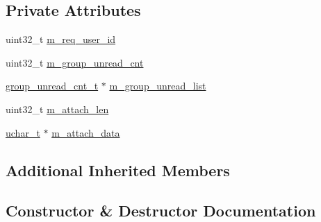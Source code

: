 \subsection*{Private Attributes}
\begin{DoxyCompactItemize}
\item 
uint32\+\_\+t \hyperlink{class_c_im_pdu_group_unread_msg_cnt_response_a74c537bd846dff72d98b2b203fbd61f1}{m\+\_\+req\+\_\+user\+\_\+id}
\item 
uint32\+\_\+t \hyperlink{class_c_im_pdu_group_unread_msg_cnt_response_ae9cb38499368408e6e37dc41002c6a03}{m\+\_\+group\+\_\+unread\+\_\+cnt}
\item 
\hyperlink{structgroup__unread__cnt__t}{group\+\_\+unread\+\_\+cnt\+\_\+t} $\ast$ \hyperlink{class_c_im_pdu_group_unread_msg_cnt_response_a0c39ff6c93b9f0c7a5ced375a6bfcd76}{m\+\_\+group\+\_\+unread\+\_\+list}
\item 
uint32\+\_\+t \hyperlink{class_c_im_pdu_group_unread_msg_cnt_response_a9a0778f7cf51c571f243a29c5b63215a}{m\+\_\+attach\+\_\+len}
\item 
\hyperlink{base_2ostype_8h_a124ea0f8f4a23a0a286b5582137f0b8d}{uchar\+\_\+t} $\ast$ \hyperlink{class_c_im_pdu_group_unread_msg_cnt_response_a869ffe993461a8adec4507f5330d31dc}{m\+\_\+attach\+\_\+data}
\end{DoxyCompactItemize}
\subsection*{Additional Inherited Members}


\subsection{Constructor \& Destructor Documentation}
\hypertarget{class_c_im_pdu_group_unread_msg_cnt_response_a3b136097918b0907bc6bd2ecfd502631}{}
